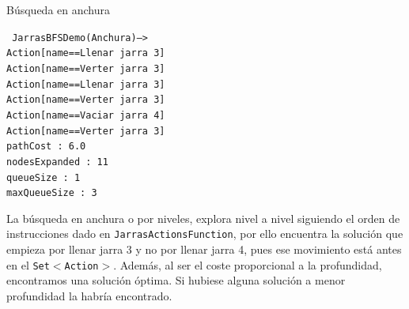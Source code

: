 \documentclass[11pt, a4paper, spanish, openright, twoside]{book}
\begin{document}
\begin{section}{Búsqueda en anchura}
	
\texttt{
	JarrasBFSDemo(Anchura)--> \\
	Action[name==Llenar jarra 3]		\\
	Action[name==Verter jarra 3] 		\\ 
	Action[name==Llenar jarra 3]		\\
	Action[name==Verter jarra 3]		\\
	Action[name==Vaciar jarra 4]		\\
	Action[name==Verter jarra 3]		\\
	pathCost : 6.0					\\
	nodesExpanded : 11			\\
	queueSize : 1					\\
	maxQueueSize : 3				
}

La búsqueda en anchura o por niveles, explora nivel a nivel siguiendo el orden de instrucciones dado en \texttt{JarrasActionsFunction}, por ello encuentra la solución que 
empieza por llenar jarra 3 y no por llenar jarra 4, pues ese movimiento está antes en el \texttt{Set$<$Action$>$}. Además, al ser el coste proporcional a la profundidad, encontramos una solución óptima.
 Si hubiese alguna solución a menor profundidad la habría encontrado.

\end{section}
\end{document}

